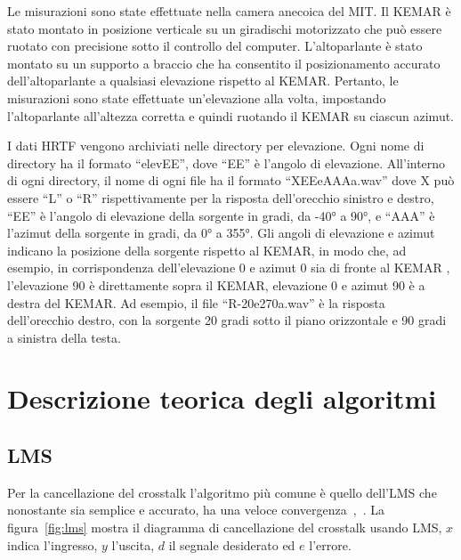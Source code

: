 \documentclass[12pt,a4paper,titlepage]{article}
\begin{document}
Le misurazioni sono state effettuate nella camera anecoica del MIT. Il KEMAR è stato montato in posizione verticale su un giradischi motorizzato che può essere ruotato con precisione sotto il controllo del computer. L'altoparlante è stato montato su un supporto a braccio che ha consentito il posizionamento accurato dell'altoparlante a qualsiasi elevazione rispetto al KEMAR. Pertanto, le misurazioni sono state effettuate un'elevazione alla volta, impostando l'altoparlante all'altezza corretta e quindi ruotando il KEMAR su ciascun azimut.

I dati HRTF vengono archiviati nelle directory per elevazione. Ogni nome di directory ha il formato ``elevEE'', dove ``EE'' è l'angolo di elevazione. All'interno di ogni directory, il nome di ogni file ha il formato ``XEEeAAAa.wav'' dove X può essere ``L'' o ``R'' rispettivamente per la risposta dell'orecchio sinistro e destro, ``EE'' è l'angolo di elevazione della sorgente in gradi, da -40° a 90°, e ``AAA'' è l'azimut della sorgente in gradi, da 0° a 355°. Gli angoli di elevazione e azimut indicano la posizione della sorgente rispetto al KEMAR, in modo che, ad esempio, in corrispondenza dell'elevazione 0 e azimut 0 sia di fronte al KEMAR , l'elevazione 90 è direttamente sopra il KEMAR, elevazione 0 e azimut 90 è a destra del KEMAR. Ad esempio, il file ``R-20e270a.wav'' è la risposta dell'orecchio destro, con la sorgente 20 gradi sotto il piano orizzontale e 90 gradi a sinistra della testa.
\clearpage
\section{Descrizione teorica degli algoritmi}
\label{sec:descrizione_teorica}
\subsection{LMS}
\label{subsec:LMS_teoria}
Per la cancellazione del crosstalk l'algoritmo più comune è quello dell'LMS che nonostante sia semplice e accurato, ha una veloce convergenza~\cite{143434},~\cite{4217047}. La figura~\ref{fig:lms} mostra il diagramma di cancellazione del crosstalk usando LMS, $x$ indica l'ingresso, $y$ l'uscita, $d$ il segnale desiderato ed $e$ l'errore.
\end{document}
